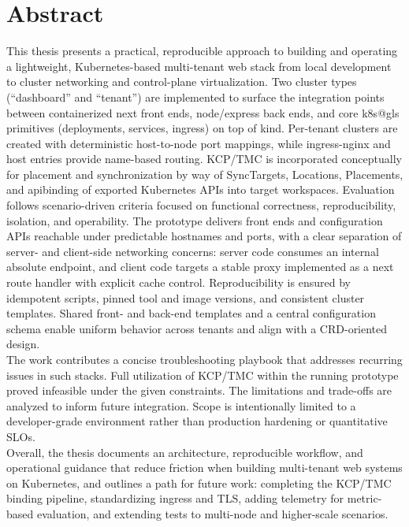 \documentclass[11pt, a4paper, oneside, listof=totoc]{scrartcl}
\begin{document}
    \section*{Abstract}\label{abstract}
        This thesis presents a practical, reproducible approach to building and operating a
        lightweight, Kubernetes-based multi-tenant web stack from local development to cluster
        networking and control-plane virtualization.
        Two cluster types (\enquote{dashboard} and \enquote{tenant}) are implemented to surface the
        integration points between containerized \gls{next} front ends, \gls{node}/\gls{express} back ends, and
        core \gls{k8s@gls} primitives (deployments, services, \gls{ingress}) on top of kind.
        Per-tenant clusters are created with deterministic host-to-node port mappings, while
        \gls{ingress}-nginx and host entries provide name-based routing.
        KCP/TMC is incorporated conceptually for placement and synchronization by way of
        SyncTargets, Locations, Placements, and \gls{apibinding} of exported Kubernetes APIs into target
        workspaces.
        Evaluation follows scenario-driven criteria focused on functional correctness,
        reproducibility, isolation, and operability.
        The prototype delivers front ends and configuration APIs reachable under predictable
        hostnames and ports, with a clear separation of server- and client-side networking concerns:
        server code consumes an internal absolute endpoint, and client code targets a stable proxy
        implemented as a \gls{next} route handler with explicit cache control.
        Reproducibility is ensured by idempotent scripts, pinned tool and image versions, and
        consistent cluster templates.
        Shared front- and back-end templates and a central configuration schema enable uniform
        behavior across tenants and align with a CRD-oriented design.\\
        The work contributes a concise troubleshooting playbook that addresses recurring issues in
        such stacks.
        Full utilization of KCP/TMC within the running prototype proved infeasible under the given
        constraints.
        The limitations and trade-offs are analyzed to inform future integration.
        Scope is intentionally limited to a developer-grade environment rather than production
        hardening or quantitative SLOs.\\
        Overall, the thesis documents an architecture, reproducible workflow, and operational
        guidance that reduce friction when building multi-tenant web systems on Kubernetes, and
        outlines a path for future work: completing the KCP/TMC binding pipeline, standardizing
        \gls{ingress} and TLS, adding telemetry for metric-based evaluation, and extending tests to
        multi-node and higher-scale scenarios.
\end{document}
